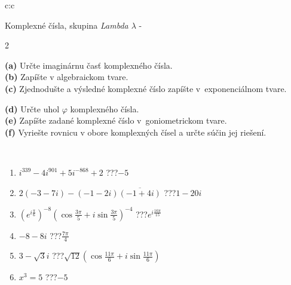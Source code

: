\documentclass[10pt]{report}
\begin{document}
\begin{tabular}{c:c}
\begin{minipage}[c][104.5mm][t]{0.5\linewidth}
\begin{center}
\vspace{7mm}
{\huge Komplexné čísla, skupina \textit{Lambda $\lambda$} -}\\[5mm]
\begin{minipage}{0.95\linewidth}
\begin{center}
{\small \begin{multicols}{2} \raggedright
\textbf{(a)} Určte imaginárnu časť komplexného čísla. \\[1mm]
\textbf{(b)} Zapíšte v algebraickom tvare. \\[1mm]
\textbf{(c)} Zjednodušte a výsledné komplexné číslo zapíšte v~exponenciálnom tvare. \par \columnbreak
\textbf{(d)} Určte uhol \(\varphi\) komplexného čísla. \\[1mm]
\textbf{(e)} Zapíšte zadané komplexné číslo v~goniometrickom tvare. \\[1mm]
\textbf{(f)} Vyriešte rovnicu v obore komplexných čísel a určte súčin jej riešení.
\end{multicols}
}
\end{center}
\end{minipage}
\\[4mm]
\begin{minipage}{0.79\linewidth}
\begin{center}
\begin{varwidth}{\linewidth}
\begin{enumerate}
\large
\item $i^{339}-4i^{901}+5i^{-868}+2$\quad \dotfill\; ???\;\dotfill \quad $-5$
\item $2(-3-7i)-(-1-2i)\overline{(-1+4i)}$\quad \dotfill\; ???\;\dotfill \quad $1-20i$
\item $\left(e^{i\frac{\pi}{6}}\right)^{-8}\left(\cos{\frac{3\pi}{5}}+i\sin{\frac{3\pi}{5}}\right)^{-4}$\quad \dotfill\; ???\;\dotfill \quad $e^{i\frac{16\pi}{15}}$
\item $-8-8i$\quad \dotfill\; ???\;\dotfill \quad $\frac{7\pi}{4}$
\item $3-\sqrt{3}i$\quad \dotfill\; ???\;\dotfill \quad $\sqrt{12}\left(\cos{\frac{11\pi}{6}}+i\sin{\frac{11\pi}{6}}\right)$
\item $x^3=5$\quad \dotfill\; ???\;\dotfill \quad $-5$
\end{enumerate}
\end{varwidth}

\end{center}
\end{minipage}
\end{center}
\end{minipage}
\end{tabular}
\end{document}
